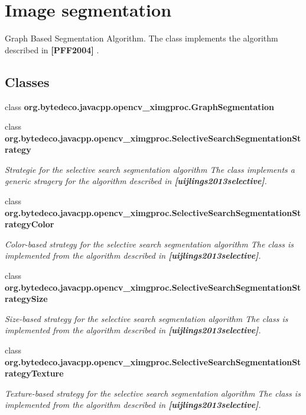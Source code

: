 \hypertarget{group__ximgproc__segmentation}{}\section{Image segmentation}
\label{group__ximgproc__segmentation}


Graph Based Segmentation Algorithm. The class implements the algorithm described in {\bfseries [P\+F\+F2004]} .  


\subsection*{Classes}
\begin{DoxyCompactItemize}
\item 
class {\bfseries org.\+bytedeco.\+javacpp.\+opencv\+\_\+ximgproc.\+Graph\+Segmentation}
\item 
class {\bfseries org.\+bytedeco.\+javacpp.\+opencv\+\_\+ximgproc.\+Selective\+Search\+Segmentation\+Strategy}
\begin{DoxyCompactList}\small\item\em Strategie for the selective search segmentation algorithm The class implements a generic stragery for the algorithm described in {\bfseries [uijlings2013selective]}. \end{DoxyCompactList}\item 
class {\bfseries org.\+bytedeco.\+javacpp.\+opencv\+\_\+ximgproc.\+Selective\+Search\+Segmentation\+Strategy\+Color}
\begin{DoxyCompactList}\small\item\em Color-\/based strategy for the selective search segmentation algorithm The class is implemented from the algorithm described in {\bfseries [uijlings2013selective]}. \end{DoxyCompactList}\item 
class {\bfseries org.\+bytedeco.\+javacpp.\+opencv\+\_\+ximgproc.\+Selective\+Search\+Segmentation\+Strategy\+Size}
\begin{DoxyCompactList}\small\item\em Size-\/based strategy for the selective search segmentation algorithm The class is implemented from the algorithm described in {\bfseries [uijlings2013selective]}. \end{DoxyCompactList}\item 
class {\bfseries org.\+bytedeco.\+javacpp.\+opencv\+\_\+ximgproc.\+Selective\+Search\+Segmentation\+Strategy\+Texture}
\begin{DoxyCompactList}\small\item\em Texture-\/based strategy for the selective search segmentation algorithm The class is implemented from the algorithm described in {\bfseries [uijlings2013selective]}. \end{DoxyCompactList}\item 

\end{DoxyCompactItemize}
